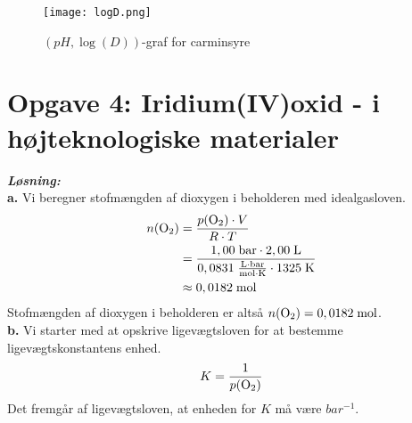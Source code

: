\documentclass{report}
\newcommand{\sol}{\setlength{\parindent}{0cm}\textbf{\textit{Løsning:}}\setlength{\parindent}{1cm}}
\begin{document}
\begin{figure}[H]
\begin{center}
  \texttt{[image: logD.png]}
\end{center}
  \caption{$(pH, \log\left(D\right) )$-graf for carminsyre}
\label{fig:D}
\end{figure}

\section*{Opgave 4: Iridium(IV)oxid - i højteknologiske materialer}
\sol \\
\textbf{a.}
Vi beregner stofmængden af dioxygen i beholderen med idealgasloven.
\begin{equation*}
\begin{split}
  n(\ce{O2} )&=\frac{p(\ce{O2} ) \cdot V}{R \cdot T}\\
  &=\frac{1,00 \;\unit{bar} \cdot 2,00 \;\unit{L} }{0,0831 \;\unit{\frac{L \cdot bar}{mol \cdot K}} \cdot 1325 \;\unit{K} }\\
  &\approx 0,0182 \;\unit{mol} 
\end{split}
\end{equation*}
Stofmængden af dioxygen i beholderen er altså $n(\ce{O2} )=0,0182 \;\unit{mol} $. \\[1ex]
\textbf{b.}
Vi starter med at opskrive ligevægtsloven for at bestemme ligevægtskonstantens enhed.
\begin{equation*}
\begin{split}
  K=\frac{1}{p(\ce{O2} )}
\end{split}
\end{equation*}
Det fremgår af ligevægtsloven, at enheden for $K$ må være $\unit{bar ^{-1}}$. 
\end{document}
